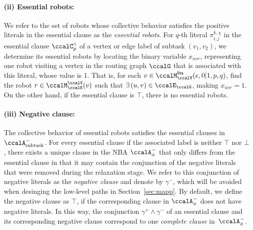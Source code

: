 \documentclass[Afour,sageh,times]{sagej}
\newcommand{\auto}[1]{\ccalA_{\textup{#1}}}
\newcommand{\autop}{\ccalA_{\phi}}
\renewcommand{\ap}[3]{\mathcal{\pi}_{{#1},{#2}}^{#3}}
\begin{document}
{   \paragraph{(ii) Essential robots:} We refer to the set of robots whose collective behavior satisfies the positive literals in the essential clause as the {\it essential robots}. For $q$-th literal $\ap{i}{j}{k,\chi}$ in the essential clause $\ccalC_p^\gamma$ of a vertex or edge label of subtask $(v_1, v_2)$, we determine its essential robots by locating the binary variable $x_{uvr}$, representing one robot visiting a vertex in the routing graph $\ccalG$ that is associated with this literal, whose value is 1. That is, for each $v\in \ccalM_{\ccalV}^\mathsf{lits} (e, 0|1, p, q)$, find the robot $r\in \ccalM_\ccalK^\ccalV(v)$ such that $\exists\, (u,v)\in\ccalE_\ccalG$, making $x_{uvr}=1$.  On the other hand, if the essential clause is $\top$, there is no essential robots.
   \paragraph{(iii) Negative clause:} The collective behavior of essential robots satisfies the essential clauses in $\auto{subtask}^-$. For every essential clause if the associated label is neither $\top$ nor $\bot$, there exists a unique clause in the NBA $\autop^-$ that only differs from the essential clause in that it may contain the conjunction of the negative literals that were removed during the relaxation stage. We refer to this conjunction of negative literals  as the {\it negative clause} and denote by $\gamma^-$, which will be avoided when desinging the low-level paths in Section~\ref{sec:mapp}.  By default, we  define the negative clause as $\top$, if the corresponding clause in $\autop^-$ does not have negative literals. In this way, the conjunction $\gamma^+ \wedge \gamma^-$ of an essential  clause and its corresponding negative clause correspond to  one {\it complete clause} in~$\autop^-$.

}
\end{document}
